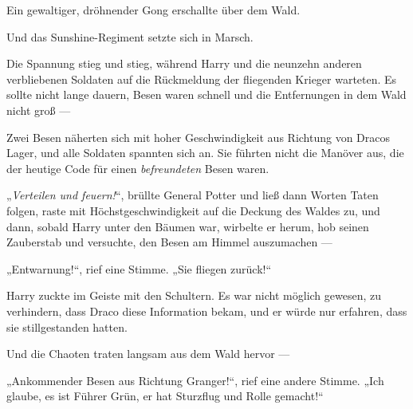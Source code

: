 \later

Ein gewaltiger, dröhnender Gong erschallte über dem Wald.

Und das Sunshine-Regiment setzte sich in Marsch.

\later

Die Spannung stieg und stieg, während Harry und die neunzehn anderen verbliebenen Soldaten auf die Rückmeldung der fliegenden Krieger warteten. Es sollte nicht lange dauern, Besen waren schnell und die Entfernungen in dem Wald nicht groß —

Zwei Besen näherten sich mit hoher Geschwindigkeit aus Richtung von Dracos Lager, und alle Soldaten spannten sich an. Sie führten nicht die Manöver aus, die der heutige Code für einen \emph{befreundeten} Besen waren.

„\emph{Verteilen und feuern!}“, brüllte General Potter und ließ dann Worten Taten folgen, raste mit Höchstgeschwindigkeit auf die Deckung des Waldes zu, und dann, sobald Harry unter den Bäumen war, wirbelte er herum, hob seinen Zauberstab und versuchte, den Besen am Himmel auszumachen —

„Entwarnung!“, rief eine Stimme.
„Sie fliegen zurück!“

Harry zuckte im Geiste mit den Schultern. Es war nicht möglich gewesen, zu verhindern, dass Draco diese Information bekam, und er würde nur erfahren, dass sie stillgestanden hatten.

Und die Chaoten traten langsam aus dem Wald hervor —

„Ankommender Besen aus Richtung Granger!“, rief eine andere Stimme.
„Ich glaube, es ist Führer Grün, er hat Sturzflug und Rolle gemacht!“

